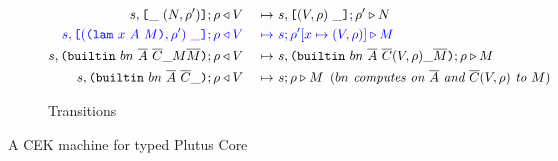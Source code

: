 \documentclass[../plutus-core-specification.tex]{subfiles}
\begin{document}
\begin{figure}[!ht]
\begin{subfigure}[c]{\linewidth}
\begin{alignat*}{2}
       s,\texttt{[} \_ ~ (N,\rho^{\prime}) \texttt{]}; \rho   &\triangleleft V &~\mapsto~& s, \texttt{[} (V,\rho) ~ \_ \texttt{]};\rho^{\prime} \triangleright N\\
       \textcolor{blue}{s,\texttt{[} (\texttt{(} \texttt{lam} ~ x ~ A ~ M \texttt{)}, \rho^{\prime}) ~ \_ \texttt{]}; \rho}
                                  &\color{blue}\triangleleft V &~\color{blue}\mapsto~& \textcolor{blue}{s;\rho^{\prime}[x\mapsto (V,\rho)] \triangleright M}\\
       s,  \texttt{(} \texttt{builtin} ~ bn ~ \overline{A} ~ \overline{C} \_ M \overline{M} \texttt{)}{}; \rho
                                  &\triangleleft V &~\mapsto~& s, \texttt{(} \texttt{builtin} ~ bn ~ \overline{A} ~ \overline{C}(V,\rho) \_ \overline{M} \texttt{)};\rho \triangleright M\\
       s,\texttt{(} \texttt{builtin} ~ bn ~ \overline{A} ~ \overline{C} \_  \texttt{)}; \rho &\triangleleft V 
                                                  &~\mapsto~& s;\rho \triangleright M \enspace (\textit{$bn$ computes on $\overline{A}$ and $\overline{C}(V,\rho)$ to $M$})\\
\end{alignat*}
\caption{Transitions}
\end{subfigure}
\caption{A CEK machine for typed Plutus Core}
\label{fig:cek-machine}
\end{figure}
\end{document}
